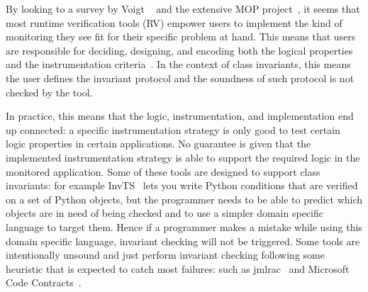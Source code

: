 By looking to a survey by Voigt \etal~\cite{Voigt2013} and the extensive MOP project~\cite{meredith2012overview},
it seems that most runtime verification tools (RV) empower users
to implement the kind of monitoring they see fit for their specific problem at hand. This means that users are responsible for deciding, designing, and encoding both the logical properties and the instrumentation criteria~\cite{meredith2012overview}.
In the context of class invariants, this means the user defines the invariant protocol and the soundness of such protocol is not checked by the tool.

In practice, this means that the logic, instrumentation, and implementation end up connected:
a specific instrumentation strategy is only good to test certain logic properties in certain applications.
No guarantee is given that the implemented instrumentation strategy is able to support the required logic in the monitored application.
Some of these tools are designed to support class invariants: for example InvTS~\cite{gorbovitski08efficient} lets you write Python conditions that are verified on a set of Python objects, but the programmer needs to be able
to predict which objects are in need of being checked and to use a simpler domain specific language to target them. Hence if a programmer makes a mistake while using this domain specific language, invariant checking
will not be triggered.
Some tools are intentionally unsound and just perform invariant checking following some heuristic that is expected to catch most failures: such as jmlrac~\cite{Burdy2005} and Microsoft Code Contracts~\cite{fahndrich2010embedded}.







%
%

